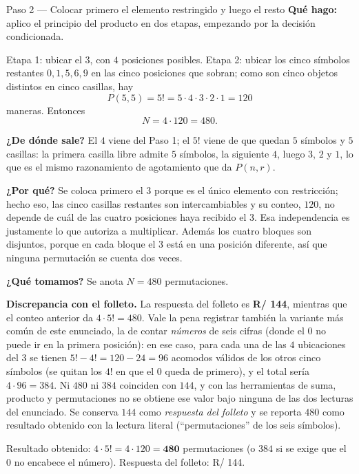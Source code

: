 \documentclass[11pt]{article}
\begin{document}
\begin{paso}{Paso 2 --- Colocar primero el elemento restringido y luego el resto}
\textbf{Qué hago:} aplico el principio del producto en dos etapas, empezando por la decisión condicionada.

Etapa 1: ubicar el $3$, con $4$ posiciones posibles. Etapa 2: ubicar los cinco símbolos restantes $0,1,5,6,9$ en las cinco posiciones que sobran; como son cinco objetos distintos en cinco casillas, hay
\[
  P(5,5)=5!=5\cdot 4\cdot 3\cdot 2\cdot 1=120
\]
maneras. Entonces
\[
  N = 4\cdot 120 = 480 .
\]

\textbf{¿De dónde sale?} El $4$ viene del Paso 1; el $5!$ viene de que quedan $5$ símbolos y $5$ casillas: la primera casilla libre admite $5$ símbolos, la siguiente $4$, luego $3$, $2$ y $1$, lo que es el mismo razonamiento de agotamiento que da $P(n,r)$.

\textbf{¿Por qué?} Se coloca primero el $3$ porque es el único elemento con restricción; hecho eso, las cinco casillas restantes son intercambiables y su conteo, $120$, no depende de cuál de las cuatro posiciones haya recibido el $3$. Esa independencia es justamente lo que autoriza a multiplicar. Además los cuatro bloques son disjuntos, porque en cada bloque el $3$ está en una posición diferente, así que ninguna permutación se cuenta dos veces.

\textbf{¿Qué tomamos?} Se anota $N=480$ permutaciones.
\end{paso}

\begin{nota}
\textbf{Discrepancia con el folleto.} La respuesta del folleto es \textbf{R/ 144}, mientras que el conteo anterior da $4\cdot 5!=480$. Vale la pena registrar también la variante más común de este enunciado, la de contar \emph{números} de seis cifras (donde el $0$ no puede ir en la primera posición): en ese caso, para cada una de las $4$ ubicaciones del $3$ se tienen $5!-4!=120-24=96$ acomodos válidos de los otros cinco símbolos (se quitan los $4!$ en que el $0$ queda de primero), y el total sería $4\cdot 96=384$. Ni $480$ ni $384$ coinciden con $144$, y con las herramientas de suma, producto y permutaciones no se obtiene ese valor bajo ninguna de las dos lecturas del enunciado. Se conserva $144$ como \emph{respuesta del folleto} y se reporta $480$ como resultado obtenido con la lectura literal (``permutaciones'' de los seis símbolos).
\end{nota}

\begin{resp}
Resultado obtenido: $4\cdot 5!=4\cdot 120=\mathbf{480}$ permutaciones (o $384$ si se exige que el $0$ no encabece el número). Respuesta del folleto: R/ 144.
\end{resp}
\end{document}
